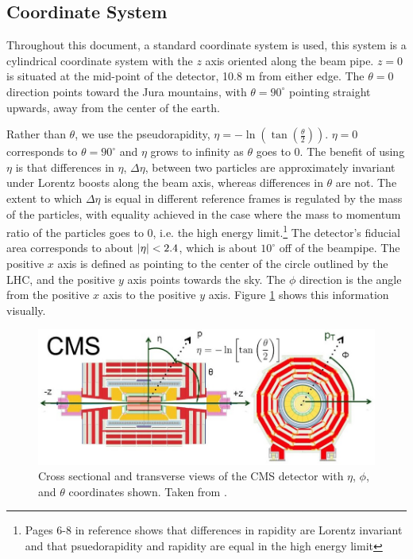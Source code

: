   \subsection{Coordinate System}
    Throughout this document, a standard coordinate system is used, this system is a cylindrical coordinate system with the $z$ axis oriented along the beam pipe. $z=0$ is situated at the mid-point of the detector, 10.8 m from either edge. The $\theta = 0$ direction points toward the Jura mountains, with $\theta = 90^\circ$ pointing straight upwards, away from the center of the earth. 

    Rather than $\theta$, we use the pseudorapidity, $\eta = - \ln \left( \tan\left(\frac{\theta}{2}\right)\right)$. $\eta = 0$ corresponds to $\theta = 90^\circ$ and $\eta$ grows to infinity as $\theta$ goes to 0. The benefit of using $\eta$ is that differences in $\eta$, $\Delta \eta$, between two particles are approximately invariant under Lorentz boosts along the beam axis, whereas differences in $\theta$ are not. The extent to which $\Delta \eta$ is equal in different reference frames is regulated by the mass of the particles, with equality achieved in the case where the mass to momentum ratio of the particles goes to 0, i.e. the high energy limit.\footnote{Pages 6-8 in reference \cite{psuedorapidity} shows that differences in rapidity are Lorentz invariant and that psuedorapidity and rapidity are equal in the high energy limit} The detector's fiducial area corresponds to about $\lvert \eta \rvert < 2.4$, which is about $10^\circ$ off of the beampipe. The positive $x$ axis is defined as pointing to the center of the circle outlined by the LHC, and the positive $y$ axis points towards the sky. The $\phi$ direction is the angle from the positive $x$ axis to the positive $y$ axis. Figure \ref{fig:cms_coordinates} shows this information visually.

    \begin{figure}[h!]
      \centering
      \includegraphics[width=.7\textwidth]{figures/cms_coordinates.jpg}
      \caption{Cross sectional and transverse views of the CMS detector with $\eta$, $\phi$, and $\theta$ coordinates shown. Taken from \cite{cms_coordinates}.}
      \label{fig:cms_coordinates}
    \end{figure}

